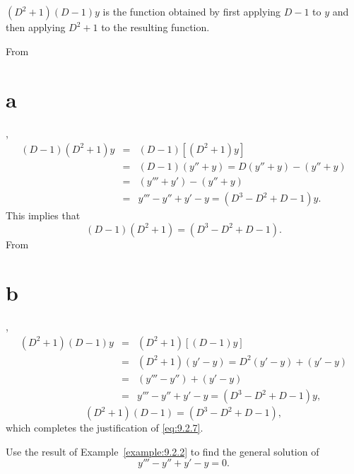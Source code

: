\begin{example}
\begin{alist}
    \item %
    $(D^{2}+1)(D-1)y$ is the function obtained by first applying $D-1$ to $y$ and then applying
    $D^{2}+1$ to the resulting function.
  \end{alist}
  From \part{a},
  \begin{equation}
    \label{eq:9.2.8}
    \begin{array}{rcl}
      (D-1)(D^{2}+1)y & = & (D-1)[(D^{2}+1)y]                 \\
                      & = & (D-1)(y''+y)=D(y''+y)-(y''+y)     \\
                      & = & (y'''+y')-(y''+y)                 \\
                      & = & y'''-y''+y'-y=(D^{3}-D^{2}+D-1)y.
    \end{array}
  \end{equation}
  This implies that
  \[
    (D-1)(D^{2}+1)=(D^{3}-D^{2}+D-1).
  \]
  From \part{b},
  \begin{equation}
    \label{eq:9.2.9}
    \begin{array}{rcl}
      (D^{2}+1)(D-1)y & = & (D^{2}+1)[(D-1)y]                  \\
                      & = & (D^{2}+1)(y'-y)=D^{2}(y'-y)+(y'-y) \\
                      & = & (y'''-y'')+(y'-y)                  \\
                      & = & y'''-y''+y'-y=(D^{3}-D^{2}+D-1)y,
    \end{array}
  \end{equation}
  \[
    (D^{2}+1)(D-1)=(D^{3}-D^{2}+D-1),
  \]
  which completes the justification of \eqref{eq:9.2.7}.
\end{example}

\begin{example}
  \label{example:9.2.3} \rm Use the result of Example~\ref{example:9.2.2} to find the general
  solution of
  \begin{equation}
    \label{eq:9.2.10}y'''-y''+y'-y=0.
  \end{equation}
\end{example}

